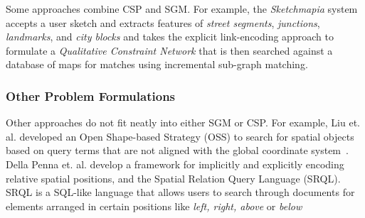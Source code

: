 \par{
        Some approaches combine CSP and SGM. For example, the \textit{Sketchmapia} system accepts a user sketch and extracts features of \textit{street segments}, \textit{junctions}, \textit{landmarks}, and \textit{city blocks} and takes the explicit link-encoding approach to formulate a \textit{Qualitative Constraint Network} that is then searched against a database of maps for matches using incremental sub-graph matching.
}    
\subsubsection{Other Problem Formulations}
\par{
    Other approaches do not fit neatly into either SGM or CSP. For example, Liu et. al. developed an Open Shape-based Strategy (OSS) to search for spatial objects based on query terms that are not aligned with the global coordinate system~\cite{Liu2003}.
    Della Penna et. al. develop a framework for implicitly and explicitly encoding relative spatial positions, and the Spatial Relation Query Language (SRQL).  
    SRQL is a SQL-like language that allows users to search through documents for elements arranged in certain positions like \textit{left, right, above} or \textit{below}~\cite{Dellapenna2012, Dellapenna2017}
}

